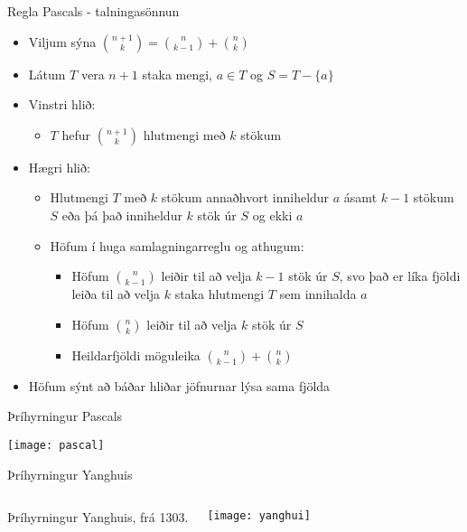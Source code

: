 \documentclass[handout]{beamer}
\begin{document}
\begin{frame}{Regla Pascals - talningasönnun}
    \begin{itemize}
        \item Viljum sýna $\binom{n+1}{k} = \binom{n}{k-1} + \binom{n}{k}$ \pause
        \item Látum $T$ vera $n+1$ staka mengi, $a \in T$ og $S = T - \{a\}$ \pause
        \item Vinstri hlið:
        \begin{itemize}
            \item $T$ hefur $\binom{n+1}{k}$ hlutmengi með $k$ stökum \pause
        \end{itemize}
        \item Hægri hlið:
        \begin{itemize}
            \item Hlutmengi $T$ með $k$ stökum annaðhvort inniheldur $a$ ásamt $k-1$ stökum $S$ eða þá það inniheldur $k$ stök úr $S$ og ekki $a$
            \item Höfum í huga samlagningarreglu og athugum: \pause
            \begin{itemize}
                \item Höfum $\binom{n}{k-1}$ leiðir til að velja $k-1$ stök úr $S$, svo það er líka fjöldi leiða til að velja $k$ staka hlutmengi $T$ sem innihalda $a$
                \item Höfum $\binom{n}{k}$ leiðir til að velja $k$ stök úr $S$
                \item Heildarfjöldi möguleika $\binom{n}{k-1} + \binom{n}{k}$
            \end{itemize}
        \end{itemize} \pause
        \item Höfum sýnt að báðar hliðar jöfnurnar lýsa sama fjölda
    \end{itemize}
\end{frame}

\begin{frame}{Þríhyrningur Pascals}
    \begin{center}
    \texttt{[image: pascal]}
    \end{center}
\end{frame}
    
\begin{frame}{Þríhyrningur Yanghuis}
    \begin{columns}
    Þríhyrningur Yanghuis, frá 1303.
    \begin{center}
    \texttt{[image: yanghui]}
    \end{center}
    \end{columns}
\end{frame}
\end{document}
